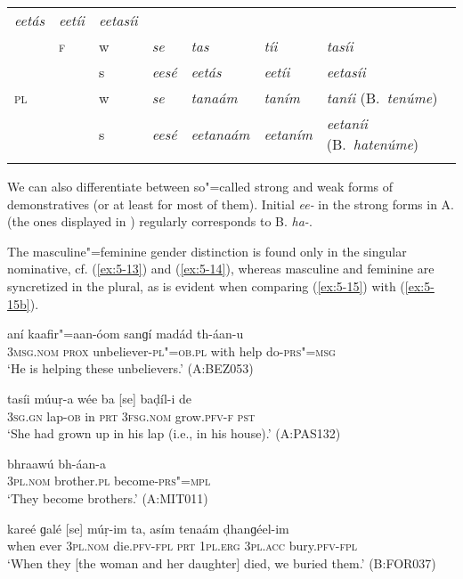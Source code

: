 \begin{table}[htp]
\begin{tabularx}{\textwidth}{ l l l Q Q Q P{23mm} }
\textit{eetás} &
\textit{eetíi} &
\textit{eetasíi} \\
&
\textsc{f} &
w &
\textit{se} &
\textit{tas} &
\textit{tíi} &
\textit{tasíi} \\
&
&
s &
\textit{eesé} &
\textit{eetás} &
\textit{eetíi} &
\textit{eetasíi} \\
\textsc{pl} &
&
w &
\textit{se} &
\textit{tanaám} &
\textit{taním} &
\textit{taníi} (B.~\textit{tenúme})\\
&
&
s &
\textit{eesé} &
\textit{eetanaám} &
\textit{eetaním} &
\textit{eetaníi} (B.~\textit{hatenúme})\\\lspbottomrule
\end{tabularx}
\label{tab:5-4}
\end{table}

We can also differentiate between so"=called strong and weak forms of demonstratives (or at least for most of them). Initial \textit{ee-} in the strong forms in A. (the ones displayed in ) regularly corresponds to B. \textit{ha-}. 

The masculine"=feminine gender distinction is found only in the singular nominative, cf. (\ref{ex:5-13}) and (\ref{ex:5-14}), whereas masculine and feminine are syncretized in the plural, as is evident when comparing (\ref{ex:5-15}) with (\ref{ex:5-15b}). 


\begin{exe}
\ex
\label{ex:5-13}
\gll [so] aní kaafir"=aan-óom sanɡí madád th-áan-u \\
\textsc{3msg}.\textsc{nom} \textsc{prox} unbeliever-\textsc{pl"=ob.pl} with help do-\textsc{prs"=msg}\\
\glt `He is helping these unbelievers.' (A:BEZ053)

\ex
\label{ex:5-14}
\gll tasíi múuṛ-a wée ba [se] baḍíl-i de \\
\textsc{3sg}.\textsc{gn} lap-\textsc{ob} in \textsc{prt} \textsc{3fsg}.\textsc{nom}
grow.\textsc{pfv-f} \textsc{pst}\\
\glt `She had grown up in his lap (i.e., in his house).' (A:PAS132)

\ex
\label{ex:5-15}
\gll [se] bhraawú bh-áan-a\\
\textsc{3pl}.\textsc{nom} brother.\textsc{pl} become-\textsc{prs"=mpl}\\
\glt `They become brothers.' (A:MIT011)

\ex
\label{ex:5-15b}
\gll kareé ɡalé [se] múṛ-im ta, asím  tenaám ḍhanɡéel-im\\
when ever \textsc{3pl.nom} die.\textsc{pfv}-\textsc{fpl} \textsc{prt} \textsc{1pl.erg} \textsc{3pl.acc} bury.\textsc{pfv}-\textsc{fpl} \\
\glt `When they [the woman and her daughter] died, we buried them.' (B:FOR037)
\end{exe}

